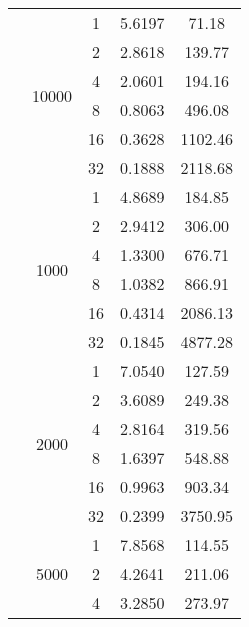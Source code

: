 \begin{tabularx}{\textwidth}{@{} c c c c c @{}}
                            \cmidrule{2-5}
                            & \multirow{6}{*}{10000} & 1  & 5.6197 & 71.18   \\
                            &                        & 2  & 2.8618 & 139.77  \\
                            &                        & 4  & 2.0601 & 194.16  \\
                            &                        & 8  & 0.8063 & 496.08  \\
                            &                        & 16 & 0.3628 & 1102.46 \\
                            &                        & 32 & 0.1888 & 2118.68 \\
\midrule\enlargethispage{-\baselineskip}
    \multirow{24}{*}{30000} & \multirow{6}{*}{1000} & 1  & 4.8689 & 184.85  \\
                            &                       & 2  & 2.9412 & 306.00  \\
                            &                       & 4  & 1.3300 & 676.71  \\
                            &                       & 8  & 1.0382 & 866.91  \\
                            &                       & 16 & 0.4314 & 2086.13 \\
                            &                       & 32 & 0.1845 & 4877.28 \\
                            \cmidrule{2-5}
                            & \multirow{6}{*}{2000} & 1  & 7.0540 & 127.59  \\
                            &                       & 2  & 3.6089 & 249.38  \\
                            &                       & 4  & 2.8164 & 319.56  \\
                            &                       & 8  & 1.6397 & 548.88  \\
                            &                       & 16 & 0.9963 & 903.34  \\
                            &                       & 32 & 0.2399 & 3750.95 \\
                            \cmidrule{2-5}
                            & \multirow{6}{*}{5000} & 1  & 7.8568 & 114.55  \\
                            &                       & 2  & 4.2641 & 211.06  \\
                            &                       & 4  & 3.2850 & 273.97  \\

\end{tabularx}
